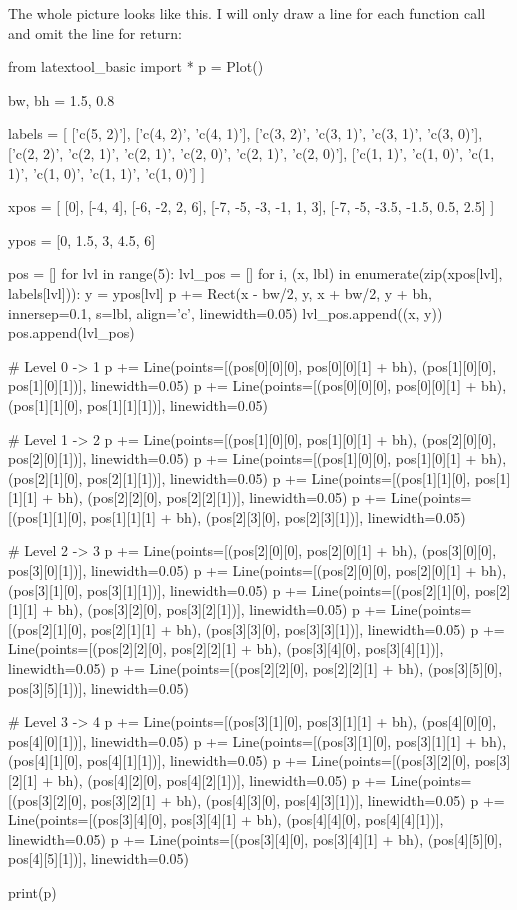 The whole picture looks like this. I will only draw a line for each
function call and omit the line for return:

\begin{python}
from latextool_basic import *
p = Plot()

bw, bh = 1.5, 0.8

labels = [
    ['c(5, 2)'],
    ['c(4, 2)', 'c(4, 1)'],
    ['c(3, 2)', 'c(3, 1)', 'c(3, 1)', 'c(3, 0)'],
    ['c(2, 2)', 'c(2, 1)', 'c(2, 1)', 'c(2, 0)', 'c(2, 1)', 'c(2, 0)'],
    ['c(1, 1)', 'c(1, 0)', 'c(1, 1)', 'c(1, 0)', 'c(1, 1)', 'c(1, 0)']
]

xpos = [
    [0],
    [-4, 4],
    [-6, -2, 2, 6],
    [-7, -5, -3, -1, 1, 3],
    [-7, -5, -3.5, -1.5, 0.5, 2.5]
]

ypos = [0, 1.5, 3, 4.5, 6]

pos = []
for lvl in range(5):
    lvl_pos = []
    for i, (x, lbl) in enumerate(zip(xpos[lvl], labels[lvl])):
        y = ypos[lvl]
        p += Rect(x - bw/2, y, x + bw/2, y + bh, innersep=0.1, s=lbl, align='c', linewidth=0.05)
        lvl_pos.append((x, y))
    pos.append(lvl_pos)

# Level 0 -> 1
p += Line(points=[(pos[0][0][0], pos[0][0][1] + bh), (pos[1][0][0], pos[1][0][1])], linewidth=0.05)
p += Line(points=[(pos[0][0][0], pos[0][0][1] + bh), (pos[1][1][0], pos[1][1][1])], linewidth=0.05)

# Level 1 -> 2
p += Line(points=[(pos[1][0][0], pos[1][0][1] + bh), (pos[2][0][0], pos[2][0][1])], linewidth=0.05)
p += Line(points=[(pos[1][0][0], pos[1][0][1] + bh), (pos[2][1][0], pos[2][1][1])], linewidth=0.05)
p += Line(points=[(pos[1][1][0], pos[1][1][1] + bh), (pos[2][2][0], pos[2][2][1])], linewidth=0.05)
p += Line(points=[(pos[1][1][0], pos[1][1][1] + bh), (pos[2][3][0], pos[2][3][1])], linewidth=0.05)

# Level 2 -> 3 
p += Line(points=[(pos[2][0][0], pos[2][0][1] + bh), (pos[3][0][0], pos[3][0][1])], linewidth=0.05)
p += Line(points=[(pos[2][0][0], pos[2][0][1] + bh), (pos[3][1][0], pos[3][1][1])], linewidth=0.05)
p += Line(points=[(pos[2][1][0], pos[2][1][1] + bh), (pos[3][2][0], pos[3][2][1])], linewidth=0.05)
p += Line(points=[(pos[2][1][0], pos[2][1][1] + bh), (pos[3][3][0], pos[3][3][1])], linewidth=0.05)
p += Line(points=[(pos[2][2][0], pos[2][2][1] + bh), (pos[3][4][0], pos[3][4][1])], linewidth=0.05)
p += Line(points=[(pos[2][2][0], pos[2][2][1] + bh), (pos[3][5][0], pos[3][5][1])], linewidth=0.05)

# Level 3 -> 4 
p += Line(points=[(pos[3][1][0], pos[3][1][1] + bh), (pos[4][0][0], pos[4][0][1])], linewidth=0.05)
p += Line(points=[(pos[3][1][0], pos[3][1][1] + bh), (pos[4][1][0], pos[4][1][1])], linewidth=0.05)
p += Line(points=[(pos[3][2][0], pos[3][2][1] + bh), (pos[4][2][0], pos[4][2][1])], linewidth=0.05)
p += Line(points=[(pos[3][2][0], pos[3][2][1] + bh), (pos[4][3][0], pos[4][3][1])], linewidth=0.05)
p += Line(points=[(pos[3][4][0], pos[3][4][1] + bh), (pos[4][4][0], pos[4][4][1])], linewidth=0.05)
p += Line(points=[(pos[3][4][0], pos[3][4][1] + bh), (pos[4][5][0], pos[4][5][1])], linewidth=0.05)

print(p)
\end{python}

